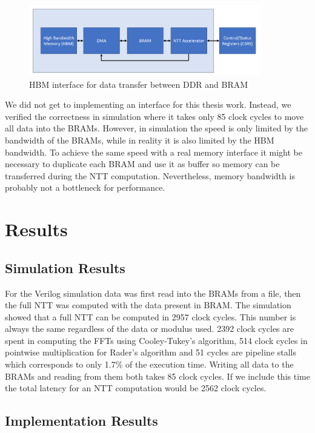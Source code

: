 \documentclass[english,master=eelt,masteroption=ec]{kulemt}
\begin{document}
\begin{figure}[h]
\centering
\includegraphics[width=0.9\textwidth]{img/memory_interface.png}
\caption{HBM interface for data transfer between DDR and BRAM}
\label{fig:mem_interface}
\end{figure}

\FloatBarrier

We did not get to implementing an interface for this thesis work. Instead, we verified the correctness in simulation where it takes only 85 clock cycles to move all data into the BRAMs. However, in simulation the speed is only limited by the bandwidth of the BRAMs, while in reality it is also limited by the HBM bandwidth. To achieve the same speed with a real memory interface it might be necessary to duplicate each BRAM and use it as buffer so memory can be transferred during the NTT computation. Nevertheless, memory bandwidth is probably not a bottleneck for performance.

\section{Results}

\subsection{Simulation Results}

For the Verilog simulation data was first read into the BRAMs from a file, then the full NTT was computed with the data present in BRAM. The simulation showed that a full NTT can be computed in 2957 clock cycles. This number is always the same regardless of the data or modulus used. 2392 clock cycles are spent in computing the FFTs using Cooley-Tukey's algorithm, 514 clock cycles in pointwise multiplication for Rader's algorithm and 51 cycles are pipeline stalls which corresponds to only 1.7\% of the execution time. Writing all data to the BRAMs and reading from them both takes 85 clock cycles. If we include this time the total latency for an NTT computation would be 2562 clock cycles.

\subsection{Implementation Results}
\end{document}
